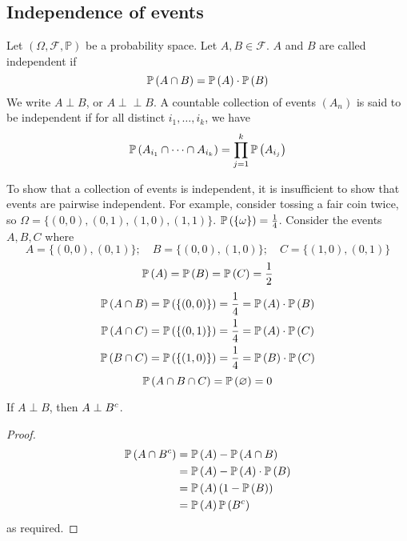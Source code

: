\subsection{Independence of events}
\begin{definition}
	Let \((\Omega, \mathcal F, \mathbb P)\) be a probability space.
	Let \(A, B \in \mathcal F\).
	\(A\) and \(B\) are called independent if
	\[
		\mathbb{P}\left({A \cap B}\right) = \mathbb{P}\left({A}\right) \cdot \mathbb{P}\left({B}\right)
	\]
	We write \(A \perp B\), or \(A \perp\!\!\!\perp B\).
	A countable collection of events \((A_n)\) is said to be independent if for all distinct \(i_1, \dots, i_k\), we have
	\[
		\mathbb{P}\left({A_{i_1} \cap \dots \cap A_{i_k}}\right) = \prod_{j=1}^k \mathbb{P}\left({A_{i_j}}\right)
	\]
\end{definition}
\begin{remark}
	To show that a collection of events is independent, it is insufficient to show that events are pairwise independent.
	For example, consider tossing a fair coin twice, so \(\Omega = \{ (0, 0), (0, 1), (1, 0), (1, 1) \}\).
	\(\mathbb{P}\left({\{\omega\}}\right) = \frac{1}{4}\).
	Consider the events \(A, B, C\) where
	\[
		A = \{ (0, 0), (0, 1) \};\quad B = \{ (0, 0), (1, 0) \};\quad C = \{ (1, 0), (0, 1) \}
	\]
	\[
		\mathbb{P}\left({A}\right) = \mathbb{P}\left({B}\right) = \mathbb{P}\left({C}\right) = \frac{1}{2}
	\]
	\begin{align*}
		\mathbb{P}\left({A \cap B}\right) = \mathbb{P}\left({\{ (0, 0) \}}\right) & = \frac{1}{4} = \mathbb{P}\left({A}\right) \cdot \mathbb{P}\left({B}\right) \\
		\mathbb{P}\left({A \cap C}\right) = \mathbb{P}\left({\{ (0, 1) \}}\right) & = \frac{1}{4} = \mathbb{P}\left({A}\right) \cdot \mathbb{P}\left({C}\right) \\
		\mathbb{P}\left({B \cap C}\right) = \mathbb{P}\left({\{ (1, 0) \}}\right) & = \frac{1}{4} = \mathbb{P}\left({B}\right) \cdot \mathbb{P}\left({C}\right)
	\end{align*}
	\[
		\mathbb{P}\left({A \cap B \cap C}\right) = \mathbb{P}\left({\varnothing}\right) = 0
	\]
\end{remark}
\begin{claim}
	If \(A \perp B\), then \(A \perp {B}^c\).
\end{claim}
\begin{proof}
	\begin{align*}
		\mathbb{P}\left({A \cap {B}^c}\right) & = \mathbb{P}\left({A}\right) - \mathbb{P}\left({A \cap B}\right)           \\
		                         & = \mathbb{P}\left({A}\right) - \mathbb{P}\left({A}\right) \cdot \mathbb{P}\left({B}\right)   \\
		                         & = \mathbb{P}\left({A}\right) \left( 1 - \mathbb{P}\left({B}\right) \right) \\
		                         & = \mathbb{P}\left({A}\right) \mathbb{P}\left({{B}^c}\right)
	\end{align*}
	as required.
\end{proof}


